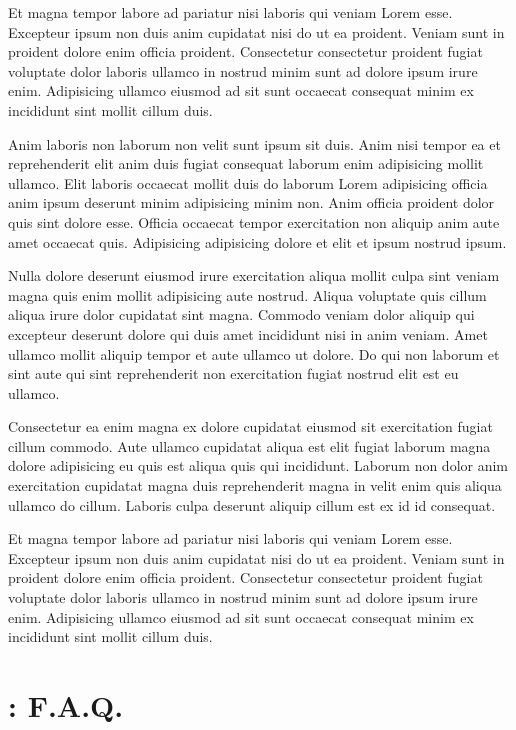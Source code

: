 \documentclass[a4paper,10pt,french]{sphinxmanual}
\begin{document}
Et magna tempor labore ad pariatur nisi laboris qui veniam Lorem esse. Excepteur ipsum non duis anim cupidatat nisi do ut ea proident. Veniam sunt in proident dolore enim officia proident. Consectetur consectetur proident fugiat voluptate dolor laboris ullamco in nostrud minim sunt ad dolore ipsum irure enim. Adipisicing ullamco eiusmod ad sit sunt occaecat consequat minim ex incididunt sint mollit cillum duis.

Anim laboris non laborum non velit sunt ipsum sit duis. Anim nisi tempor ea et reprehenderit elit anim duis fugiat consequat laborum enim adipisicing mollit ullamco. Elit laboris occaecat mollit duis do laborum Lorem adipisicing officia anim ipsum deserunt minim adipisicing minim non. Anim officia proident dolor quis sint dolore esse. Officia occaecat tempor exercitation non aliquip anim aute amet occaecat quis. Adipisicing adipisicing dolore et elit et ipsum nostrud ipsum.

Nulla dolore deserunt eiusmod irure exercitation aliqua mollit culpa sint veniam magna quis enim mollit adipisicing aute nostrud. Aliqua voluptate quis cillum aliqua irure dolor cupidatat sint magna. Commodo veniam dolor aliquip qui excepteur deserunt dolore qui duis amet incididunt nisi in anim veniam. Amet ullamco mollit aliquip tempor et aute ullamco ut dolore. Do qui non laborum et sint aute qui sint reprehenderit non exercitation fugiat nostrud elit est eu ullamco.

Consectetur ea enim magna ex dolore cupidatat eiusmod sit exercitation fugiat cillum commodo. Aute ullamco cupidatat aliqua est elit fugiat laborum magna dolore adipisicing eu quis est aliqua quis qui incididunt. Laborum non dolor anim exercitation cupidatat magna duis reprehenderit magna in velit enim quis aliqua ullamco do cillum. Laboris culpa deserunt aliquip cillum est ex id id consequat.

Et magna tempor labore ad pariatur nisi laboris qui veniam Lorem esse. Excepteur ipsum non duis anim cupidatat nisi do ut ea proident. Veniam sunt in proident dolore enim officia proident. Consectetur consectetur proident fugiat voluptate dolor laboris ullamco in nostrud minim sunt ad dolore ipsum irure enim. Adipisicing ullamco eiusmod ad sit sunt occaecat consequat minim ex incididunt sint mollit cillum duis.


\chapter{ : F.A.Q.}
\label{\detokenize{docs/refs/autocad-faq:autocad-faq}}\label{\detokenize{docs/refs/autocad-faq::doc}}\label{\detokenize{docs/refs/autocad-faq:autodesk}}\label{\detokenize{docs/refs/autocad-faq:acad-f-a-q}}
\end{document}
